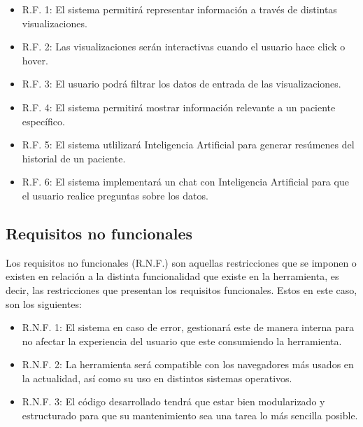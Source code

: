 \begin{itemize}
    \item R.F. 1: El sistema permitirá representar información a través de distintas visualizaciones.
    \item R.F. 2: Las visualizaciones serán interactivas cuando el usuario hace click o hover.
    \item R.F. 3: El usuario podrá filtrar los datos de entrada de las visualizaciones.
    \item R.F. 4: El sistema permitirá mostrar información relevante a un paciente específico.
    \item R.F. 5: El sistema utlilizará Inteligencia Artificial para generar resúmenes del historial de un paciente.
    \item R.F. 6: El sistema implementará un chat con Inteligencia Artificial para que el usuario realice preguntas sobre los datos.
    
\end{itemize}

\subsection{Requisitos no funcionales}

Los requisitos no funcionales (R.N.F.) son aquellas restricciones que se imponen o existen en relación a la distinta funcionalidad que existe en la herramienta, es decir, las restricciones que presentan los requisitos funcionales. Estos en este caso, son los siguientes:

\begin{itemize}
    \item R.N.F. 1: El sistema en caso de error, gestionará este de manera interna para no afectar la experiencia del usuario que este consumiendo la herramienta.
    \item R.N.F. 2: La herramienta será compatible con los navegadores más usados en la actualidad, así como su uso en distintos sistemas operativos. 
    \item R.N.F. 3: El código desarrollado tendrá que estar bien modularizado y estructurado para que su mantenimiento sea una tarea lo más sencilla posible.
    
\end{itemize}


